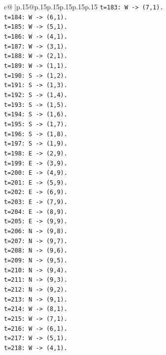 \documentclass{article}
\begin{document}
{\begin{supertabular}{c@{$\;$}|p{.15\linewidth}@{}p{.15\linewidth}p{.15\linewidth}p{.15\linewidth}p{.15\linewidth}p{.15\linewidth}}
{{{\texttt{t=183: W {-}> (7,1).} \\
\texttt{t=184: W {-}> (6,1).} \\
\texttt{t=185: W {-}> (5,1).} \\
\texttt{t=186: W {-}> (4,1).} \\
\texttt{t=187: W {-}> (3,1).} \\
\texttt{t=188: W {-}> (2,1).} \\
\texttt{t=189: W {-}> (1,1).} \\
\texttt{t=190: S {-}> (1,2).} \\
\texttt{t=191: S {-}> (1,3).} \\
\texttt{t=192: S {-}> (1,4).} \\
\texttt{t=193: S {-}> (1,5).} \\
\texttt{t=194: S {-}> (1,6).} \\
\texttt{t=195: S {-}> (1,7).} \\
\texttt{t=196: S {-}> (1,8).} \\
\texttt{t=197: S {-}> (1,9).} \\
\texttt{t=198: E {-}> (2,9).} \\
\texttt{t=199: E {-}> (3,9).} \\
\texttt{t=200: E {-}> (4,9).} \\
\texttt{t=201: E {-}> (5,9).} \\
\texttt{t=202: E {-}> (6,9).} \\
\texttt{t=203: E {-}> (7,9).} \\
\texttt{t=204: E {-}> (8,9).} \\
\texttt{t=205: E {-}> (9,9).} \\
\texttt{t=206: N {-}> (9,8).} \\
\texttt{t=207: N {-}> (9,7).} \\
\texttt{t=208: N {-}> (9,6).} \\
\texttt{t=209: N {-}> (9,5).} \\
\texttt{t=210: N {-}> (9,4).} \\
\texttt{t=211: N {-}> (9,3).} \\
\texttt{t=212: N {-}> (9,2).} \\
\texttt{t=213: N {-}> (9,1).} \\
\texttt{t=214: W {-}> (8,1).} \\
\texttt{t=215: W {-}> (7,1).} \\
\texttt{t=216: W {-}> (6,1).} \\
\texttt{t=217: W {-}> (5,1).} \\
\texttt{t=218: W {-}> (4,1).} \\
}}}
\end{supertabular}}
\end{document}
